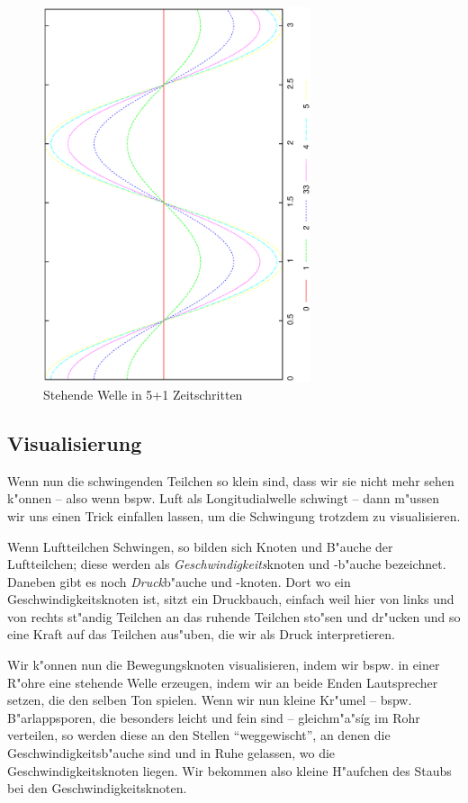 \begin{figure}
   \centering
   \includegraphics[width=0.7\textwidth,angle=-90]{bilder/stehend}
   \caption{Stehende Welle in 5+1 Zeitschritten}
   \label{abb_stehend}
\end{figure}




\subsection{Visualisierung}
\label{kap_visualisierung}


Wenn nun die schwingenden Teilchen so klein sind, dass wir sie nicht
mehr sehen k"onnen -- also wenn bspw. Luft als Longitudialwelle
schwingt -- dann m"ussen wir uns einen Trick einfallen lassen, um die
Schwingung trotzdem zu visualisieren.

Wenn Luftteilchen Schwingen, so bilden sich Knoten und B"auche der
Luftteilchen; diese werden als \emph{Geschwindigkeits}knoten und
-b"auche bezeichnet. Daneben gibt es noch \emph{Druck}b"auche und
-knoten. Dort wo ein Geschwindigkeitsknoten ist, sitzt ein Druckbauch,
einfach weil hier von links und von rechts st"andig Teilchen an das
ruhende Teilchen sto"sen und dr"ucken und so eine Kraft auf das Teilchen
aus"uben, die wir als Druck interpretieren.

Wir k"onnen nun die Bewegungsknoten visualisieren, indem wir bspw. in
einer R"ohre eine stehende Welle erzeugen, indem wir an beide Enden
Lautsprecher setzen, die den selben Ton spielen. Wenn wir nun kleine
Kr"umel -- bspw. B"arlappsporen, die besonders leicht und fein sind --
gleichm"a"síg im Rohr verteilen, so werden diese an den Stellen
"`weggewischt"', an denen die Geschwindigkeitsb"auche sind und in Ruhe
gelassen, wo die Geschwindigkeitsknoten liegen.  Wir bekommen also
kleine H"aufchen des Staubs bei den Geschwindigkeitsknoten.





